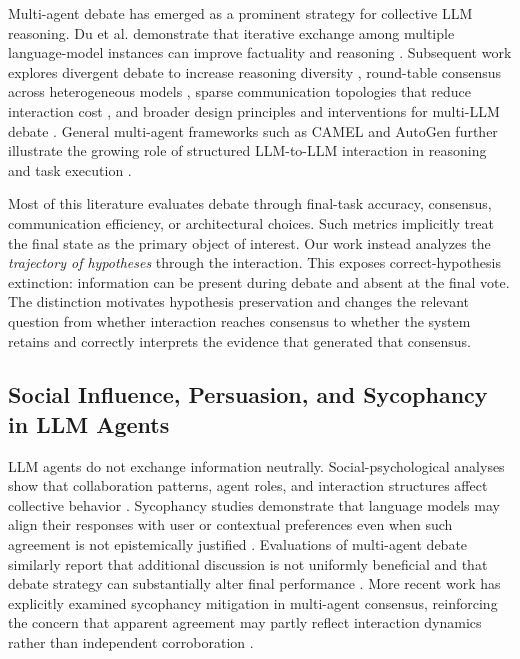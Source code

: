 Multi-agent debate has emerged as a prominent strategy for collective LLM reasoning. Du et al. demonstrate that iterative exchange among multiple language-model instances can improve factuality and reasoning \cite{du2023multiagent}. Subsequent work explores divergent debate to increase reasoning diversity \cite{liang2024debate}, round-table consensus across heterogeneous models \cite{chen2024reconcile}, sparse communication topologies that reduce interaction cost \cite{li2024sparse}, and broader design principles and interventions for multi-LLM debate \cite{estornell2024multillm}. General multi-agent frameworks such as CAMEL and AutoGen further illustrate the growing role of structured LLM-to-LLM interaction in reasoning and task execution \cite{li2023camel,wu2023autogen}.

Most of this literature evaluates debate through final-task accuracy, consensus, communication efficiency, or architectural choices. Such metrics implicitly treat the final state as the primary object of interest. Our work instead analyzes the \emph{trajectory of hypotheses} through the interaction. This exposes correct-hypothesis extinction: information can be present during debate and absent at the final vote. The distinction motivates hypothesis preservation and changes the relevant question from whether interaction reaches consensus to whether the system retains and correctly interprets the evidence that generated that consensus.

\subsection{Social Influence, Persuasion, and Sycophancy in LLM Agents}
\label{subsec:rw_social}

LLM agents do not exchange information neutrally. Social-psychological analyses show that collaboration patterns, agent roles, and interaction structures affect collective behavior \cite{zhang2024collaboration}. Sycophancy studies demonstrate that language models may align their responses with user or contextual preferences even when such agreement is not epistemically justified \cite{sharma2024sycophancy}. Evaluations of multi-agent debate similarly report that additional discussion is not uniformly beneficial and that debate strategy can substantially alter final performance \cite{smit2024mad}. More recent work has explicitly examined sycophancy mitigation in multi-agent consensus, reinforcing the concern that apparent agreement may partly reflect interaction dynamics rather than independent corroboration \cite{zhang2025consensagent}.

